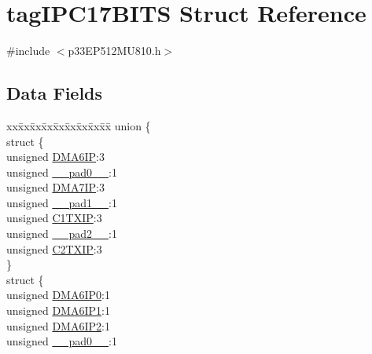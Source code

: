 \hypertarget{structtag_i_p_c17_b_i_t_s}{}\section{tag\+I\+P\+C17\+B\+I\+TS Struct Reference}
\label{structtag_i_p_c17_b_i_t_s}


{\ttfamily \#include $<$p33\+E\+P512\+M\+U810.\+h$>$}

\subsection*{Data Fields}
\begin{DoxyCompactItemize}
\item 
\begin{tabbing}
xx\=xx\=xx\=xx\=xx\=xx\=xx\=xx\=xx\=\kill
union \{\\
\>struct \{\\
\>\>unsigned \hyperlink{structtag_i_p_c17_b_i_t_s_a7614eadbb8028a8de3a7c47df06d9c13}{DMA6IP}:3\\
\>\>unsigned \hyperlink{structtag_i_p_c17_b_i_t_s_adf71f3d8410c1f1dbbc96680a92c49af}{\_\_pad0\_\_}:1\\
\>\>unsigned \hyperlink{structtag_i_p_c17_b_i_t_s_a43047f3034bb640b524710d853eb0500}{DMA7IP}:3\\
\>\>unsigned \hyperlink{structtag_i_p_c17_b_i_t_s_acaf2d0924a107ec6e8d2e31febaf66f9}{\_\_pad1\_\_}:1\\
\>\>unsigned \hyperlink{structtag_i_p_c17_b_i_t_s_a52b12e2a1e8145645e46a49f1683b22e}{C1TXIP}:3\\
\>\>unsigned \hyperlink{structtag_i_p_c17_b_i_t_s_a4d97cc5f7d51d22fc2bf3eab35c9cb7f}{\_\_pad2\_\_}:1\\
\>\>unsigned \hyperlink{structtag_i_p_c17_b_i_t_s_a32c0f184ee8b98d54b929c7125c5ef98}{C2TXIP}:3\\
\>\} \\
\>struct \{\\
\>\>unsigned \hyperlink{structtag_i_p_c17_b_i_t_s_a8189375a2339ea087f46472b21aac74a}{DMA6IP0}:1\\
\>\>unsigned \hyperlink{structtag_i_p_c17_b_i_t_s_a123f882af9292fae41210b1c5acb52ff}{DMA6IP1}:1\\
\>\>unsigned \hyperlink{structtag_i_p_c17_b_i_t_s_a24462df5d4a9a9eaf105fb6d0caf7efa}{DMA6IP2}:1\\
\>\>unsigned \hyperlink{structtag_i_p_c17_b_i_t_s_adf71f3d8410c1f1dbbc96680a92c49af}{\_\_pad0\_\_}:1\\

\end{tabbing}
\end{DoxyCompactItemize}

